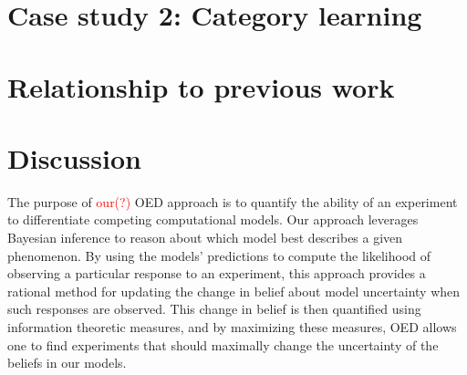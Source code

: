 \documentclass{article}
\newcommand{\red}[1]{\textcolor{Red}{#1}}
\begin{document}
\section{Case study 2: Category learning}
\section{Relationship to previous work}
\section{Discussion}

The purpose of \red{our(?)} OED approach is to quantify the ability of an experiment to differentiate competing computational models. Our approach leverages Bayesian inference to reason about which model best describes a given phenomenon. By using the models' predictions to compute the likelihood of observing a particular response to an experiment, this approach provides a rational method for updating the change in belief about model uncertainty when such responses are observed. This change in belief is then quantified using information theoretic measures, and by maximizing these measures, OED allows one to find experiments that should maximally change the uncertainty of the beliefs in our models. 

%
%
\end{document}
